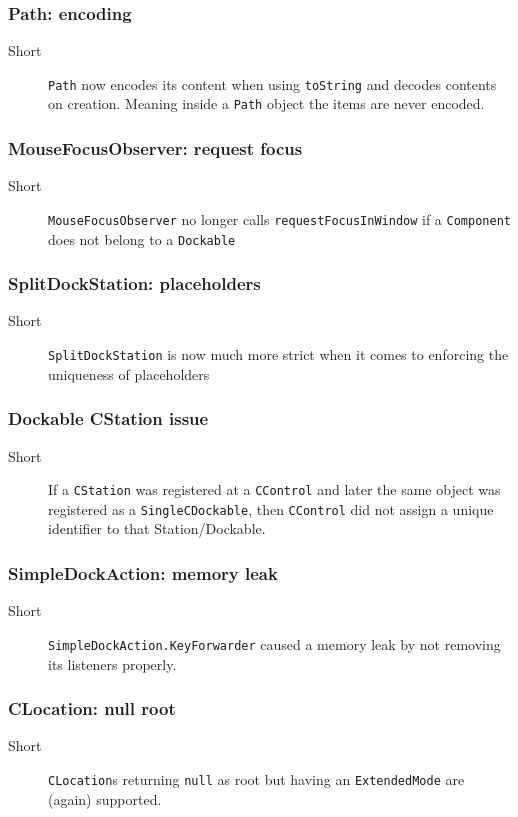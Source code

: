 \documentclass[a4paper,10pt]{article}
\newcommand{\src}[1]{\lstinline[basicstyle=\normalsize\ttfamily,keywordstyle=\normalsize\ttfamily,identifierstyle=\normalsize\ttfamily]|#1|}
\newcommand{\short}{\item[Short]}
\begin{document}
\subsubsection{Path: encoding}
\begin{description}
 \short \src{Path} now encodes its content when using \src{toString} and decodes contents on creation. Meaning inside a \src{Path} object the items are never encoded.
\end{description}

\subsubsection{MouseFocusObserver: request focus}
\begin{description}
 \short \src{MouseFocusObserver} no longer calls \src{requestFocusInWindow} if a \linebreak \src{Component} does not belong to a \src{Dockable}
\end{description}

\subsubsection{SplitDockStation: placeholders}
\begin{description}
 \short \src{SplitDockStation} is now much more strict when it comes to enforcing the uniqueness of placeholders
\end{description}

\subsubsection{Dockable CStation issue}
\begin{description}
 \short If a \src{CStation} was registered at a \src{CControl} and later the same object was registered as a \src{SingleCDockable}, then \src{CControl} did not assign a unique identifier to that Station/Dockable. 
\end{description}

\subsubsection{SimpleDockAction: memory leak}
\begin{description}
 \short \src{SimpleDockAction.KeyForwarder} caused a memory leak by not removing its listeners properly.
\end{description}

\subsubsection{CLocation: null root}
\begin{description}
 \short \src{CLocation}s returning \src{null} as root but having an \src{ExtendedMode} are (again) supported.
\end{description}
\end{document}
